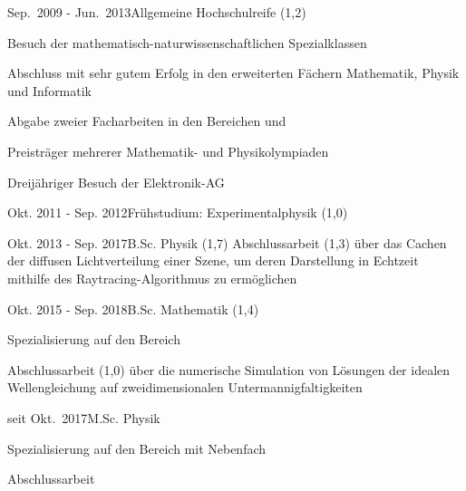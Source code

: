\documentclass[a4paper,10pt]{cv}
\begin{document}
  \cvHead
      \begin{cvTimeItem}{Sep.~2009 - Jun.~2013}{Allgemeine Hochschulreife (1,2)}
        \begin{cvItemize}
          \item Besuch der mathematisch-naturwissenschaftlichen Spezialklassen
          \item Abschluss mit sehr gutem Erfolg in den erweiterten Fächern Mathematik, Physik und Informatik
          \item Abgabe zweier Facharbeiten in den Bereichen  und 
          \item Preisträger mehrerer Mathematik- und Physikolympiaden
          \item Dreijähriger Besuch der Elektronik-AG
        \end{cvItemize}
      \end{cvTimeItem}

      \begin{cvTimeItem}{Okt. 2011 - Sep. 2012}{Frühstudium: Experimentalphysik (1,0)}
      \end{cvTimeItem}

      \begin{cvTimeItem}{Okt. 2013 - Sep. 2017}{B.Sc. Physik (1,7)}
        Abschlussarbeit  (1,3) über das Cachen der diffusen Lichtverteilung einer Szene, um deren Darstellung in Echtzeit mithilfe des Raytracing-Algorithmus zu ermöglichen
      \end{cvTimeItem}
      \begin{cvTimeItem}{Okt. 2015 - Sep. 2018}{B.Sc. Mathematik (1,4)}
        \begin{cvItemize}
          \item Spezialisierung auf den Bereich 
          \item Abschlussarbeit  (1,0) über die numerische Simulation von Lösungen der idealen Wellengleichung auf zweidimensionalen Untermannigfaltigkeiten
        \end{cvItemize}
      \end{cvTimeItem}
      \begin{cvTimeItem}{seit Okt.~2017}{M.Sc. Physik}
        \begin{cvItemize}
          \item Spezialisierung auf den Bereich  mit Nebenfach 
          \item Abschlussarbeit 
        \end{cvItemize}
      \end{cvTimeItem}
\end{document}

